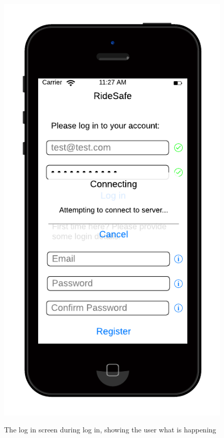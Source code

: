 \documentclass[a4paper]{report}
\begin{document}
{\begin{figure}[H]
\includegraphics[scale=0.6]{figures/final_design/login_progress}
\label{fig:login}
\caption{The log in screen during log in, showing the user what is happening}
\end{figure}
\begin{figure}[h]
\centering

\end{figure}}
\end{document}
